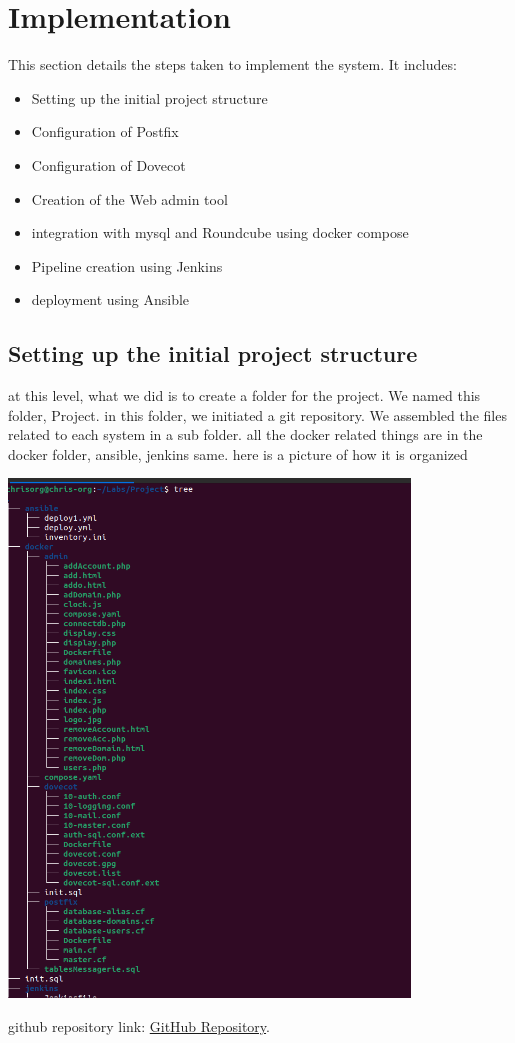 \documentclass[12pt]{article}
\begin{document}
\section{Implementation}
This section details the steps taken to implement the system. It includes:
\begin{itemize}
    \item Setting up the initial project structure
    \item Configuration of Postfix
    \item Configuration of Dovecot
    \item Creation of the Web admin tool
    \item integration with mysql and Roundcube using docker compose 
    \item Pipeline creation using Jenkins 
    \item deployment using Ansible
\end{itemize}
\subsection{Setting up the initial project structure}
at this level, what we did  is to create a folder for the project. We named this folder, Project. in this folder, we initiated a git repository. 
We assembled the files related to each system in a sub folder. all the docker related things are in the docker folder, ansible, jenkins same. 
here is a picture of how it is organized
\begin{center}
    \includegraphics[width=0.8\textwidth]{tree.png}
     \label{tree.png}
\end{center}
github repository link: \textcolor{blue}{\href{https://github.com/chrisdotorg/spe.git}{GitHub Repository}}.
\end{document}
